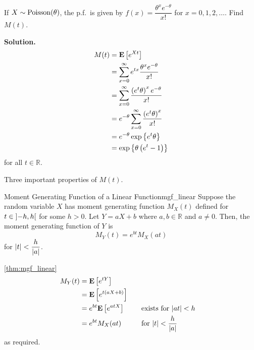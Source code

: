 \begin{Example}{}{}
    If $ X \sim \operatorname{Poisson}(\theta) $, the p.f.\ is given by
    $ f(x)=\dfrac{\theta^x e^{-\theta}}{x!} $
    for $ x=0,1,2,\ldots $. Find $ M(t) $.

    \textbf{Solution.}
    \begin{align*}
        M(t)
         & =\bm{\mathrm{E}}\left[e^{Xt}\right]                                                                    \\
         & =\sum\limits_{x=0}^{\infty} e^{tx} \frac{\theta^x e^{-\theta}}{x!}             \\
         & =\sum\limits_{x=0}^{\infty} \frac{\left( e^t \theta \right)^x e^{-\theta}}{x!} \\
         & =e^{-\theta}\sum\limits_{x=0}^{\infty} \frac{\left( e^t \theta \right)^x}{x!}  \\
         & =e^{-\theta} \exp\left\{e^t \theta\right\}                                     \\
         & =\exp\left\{\theta\left( e^t-1 \right)\right\}
    \end{align*}
    for all $ t\in\mathbb{R} $.
\end{Example}
Three important properties of $ M(t) $.

\begin{Theorem}{Moment Generating Function of a Linear Function}{mgf_linear}
    Suppose the random variable $ X $ has moment generating function
    $ M_X(t) $ defined for $ t\in\interval[open]{-h}{h} $ for some $ h>0 $.
    Let $ Y=aX+b $ where $ a,b\in\mathbb{R} $ and $ a\neq 0 $. Then,
    the moment generating function of $ Y $ is
    \[ M_Y(t)=e^{bt}M_X(at) \]
    for $ \lvert t\rvert<\dfrac{h}{\lvert a\rvert} $.
\end{Theorem}

\begin{Proof}{\ref{thm:mgf_linear}}{}
    \begin{align*}
        M_Y(t)
         & =\bm{\mathrm{E}}\left[e^{tY}\right]                                                       \\
         & =\bm{\mathrm{E}}\left[e^{t(aX+b)}\right]                                                  \\
         & =e^{bt}\bm{\mathrm{E}}\left[e^{atX}\right] & \quad & \text{exists for }\lvert at\rvert<h         \\
         & =e^{bt}M_X(at)     &       & \text{for }\lvert t\rvert<\frac{h}{\lvert a\rvert}
    \end{align*}
    as required.
\end{Proof}

